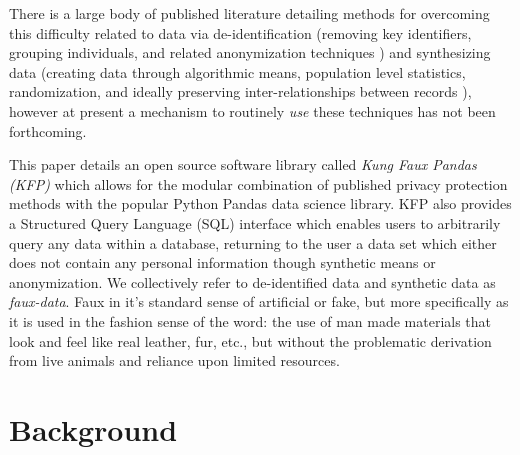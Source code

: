 \documentclass{article}
\begin{document}
There is a large body of published literature detailing methods for overcoming this difficulty related to data via de-identification (removing key identifiers, grouping individuals, and related anonymization techniques \cite{hippapro}) and synthesizing data (creating data through algorithmic means, population level statistics, randomization, and ideally preserving inter-relationships between records \cite{walonoski_synthea_2018, patki_synthetic_2016, choi_generating_2017}), however at present a mechanism to routinely \emph{use} these techniques has not been forthcoming.

This paper details an open source software library called \emph{Kung Faux Pandas (KFP)} which allows for the modular combination of published privacy protection methods with the popular Python Pandas data science library\cite{mckinney-proc-scipy-2010}. KFP also provides a Structured Query Language (SQL) interface which enables users to arbitrarily query any data within a database, returning to the user a data set which either does not contain any personal information though synthetic means or anonymization. We collectively refer to de-identified data and synthetic data as \emph{faux-data}. Faux in it's standard sense of artificial or fake, but more specifically as it is used in the fashion sense of the word: the use of man made materials that look and feel like real leather, fur, etc., but without the problematic derivation from live animals and reliance upon limited resources.

\section{Background}
\end{document}
